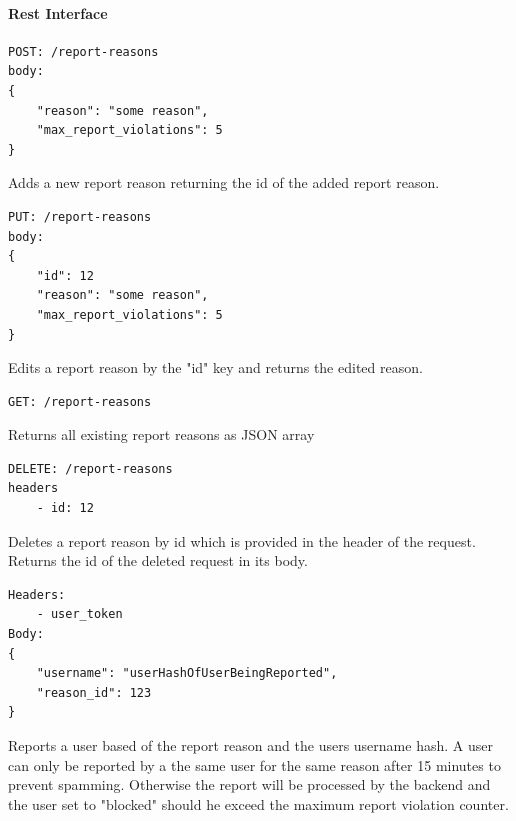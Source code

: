 \paragraph{Rest Interface}
\begin{verbatim}
POST: /report-reasons
body:
{
    "reason": "some reason",
    "max_report_violations": 5
}
\end{verbatim}
Adds a new report reason returning the id of the added report reason.

\begin{verbatim}
PUT: /report-reasons
body:
{
    "id": 12
    "reason": "some reason",
    "max_report_violations": 5
}
\end{verbatim}
Edits a report reason by the "id" key and returns the edited reason.

\begin{verbatim}
GET: /report-reasons
\end{verbatim}
Returns all existing report reasons as JSON array

\begin{verbatim}
DELETE: /report-reasons
headers
    - id: 12
\end{verbatim}
Deletes a report reason by id which is provided in the header of the request.
Returns the id of the deleted request in its body.

\begin{verbatim}
Headers:
    - user_token
Body:
{
    "username": "userHashOfUserBeingReported",
    "reason_id": 123
}
\end{verbatim}
Reports a user based of the report reason and the users username hash.
A user can only be reported by a the same user for the same reason after 15 minutes to prevent spamming.
Otherwise the report will be processed by the backend and the user set to "blocked" should he exceed the maximum report violation counter.
